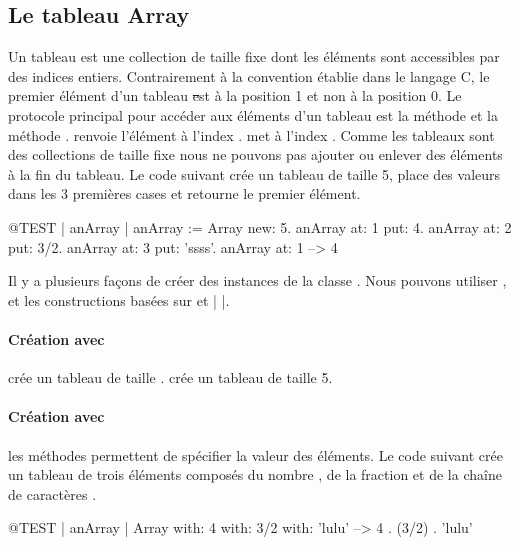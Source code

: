 \documentclass[a4paper,10pt,twoside]{book}
\begin{document}
\subsection{Le tableau Array}
Un tableau  est une collection de taille fixe
dont les éléments sont accessibles par des indices entiers.
Contrairement à la convention établie dans le langage C,
le premier élément d'un tableau \st est à la position 1 et
non à la position 0.
Le protocole principal pour accéder aux éléments d'un tableau
est la méthode
 et la méthode .
  renvoie l'élément à l'index 
.  met  à 
l'index . Comme les tableaux sont des collections de taille
fixe nous ne pouvons pas ajouter ou enlever des éléments à la fin du
tableau.
Le code suivant crée un tableau de taille 5, place des valeurs dans les 3
premières cases et retourne le premier élément.

\begin{code}{@TEST | anArray | }
anArray := Array new: 5.
anArray at: 1 put: 4.
anArray at: 2 put: 3/2.
anArray at: 3 put: 'ssss'.
anArray at: 1 --> 4
\end{code}

Il y a plusieurs façons de créer des instances de la classe 
. Nous pouvons utiliser ,  et les 
constructions basées sur \ct{#( )} et \ct|{ }|.

\paragraph{Création avec }  crée un tableau de taille .
 crée un tableau de taille 5.

\paragraph{Création avec } les méthodes 
 permettent de spécifier la valeur des éléments.
Le code suivant crée un tableau de trois éléments composés
du nombre
, de la fraction  et de la chaîne de caractères
.

\begin{code}{@TEST | anArray |}
Array with: 4 with: 3/2 with: 'lulu' -->  {4 . (3/2) . 'lulu'}
\end{code}
\end{document}
